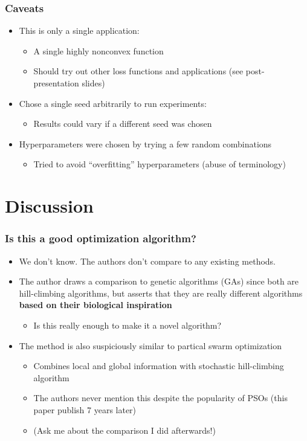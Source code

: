 \documentclass{beamer}
\begin{document}
\begin{frame}
\frametitle{Caveats}
\begin{itemize}
  \item<1-> This is only a single application:
  \begin{itemize}
    \item<1-> A single highly nonconvex function
    \item<1-> Should try out other loss functions and applications (see post-presentation slides)
  \end{itemize}
  \item<2-> Chose a single seed arbitrarily to run experiments:
  \begin{itemize}
    \item<2-> Results could vary if a different seed was chosen
  \end{itemize}
  \item<3-> Hyperparameters were chosen by trying a few random combinations
  \begin{itemize}
    \item<3-> Tried to avoid ``overfitting'' hyperparameters (abuse of terminology)
  \end{itemize}
\end{itemize}
\end{frame}

\section{Discussion}

\begin{frame}
\frametitle{Is this a good optimization algorithm?}
\begin{itemize}
  \item<1-> We don't know. The authors don't compare to any existing methods.
  \item<2-> The author draws a comparison to genetic algorithms (GAs) since both are hill-climbing algorithms, but asserts that they are really different algorithms \textbf{based on their biological inspiration}
  \begin{itemize}
    \item<2-> Is this really enough to make it a novel algorithm?
  \end{itemize}
  \item<3-> The method is also suspiciously similar to partical swarm optimization
  \begin{itemize}
    \item<4-> Combines local and global information with stochastic hill-climbing algorithm
    \item<4-> The authors never mention this despite the popularity of PSOs (this paper publish 7 years later)
    \item<5-> (Ask me about the comparison I did afterwards!)
  \end{itemize}
\end{itemize}
\end{frame}
\end{document}
